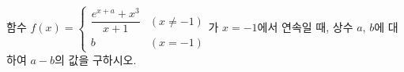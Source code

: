함수 $f(x)=\begin{cases} \dfrac{e^{x+a}+x^3}{x+1} & (x\ne -1) \\ b & (x=-1) \end{cases}$가 $x=-1$에서 연속일 때, 상수 $a$, $b$에 대하여 $a-b$의 값을 구하시오.
